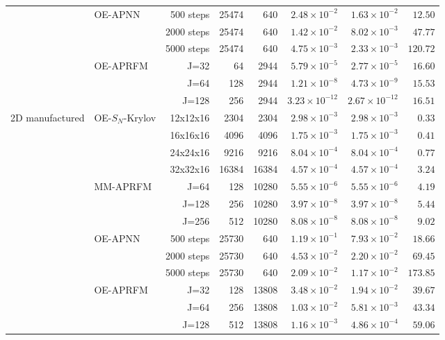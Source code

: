 \begin{table}[t]
\begin{tabular}{llrrrrrr}
 & OE-APNN & 500 steps & 25474 & 640 & $2.48\times10^{-2}$ & $1.63\times10^{-2}$ & $12.50$\\
 &  & 2000 steps & 25474 & 640 & $1.42\times10^{-2}$ & $8.02\times10^{-3}$ & $47.77$\\
 &  & 5000 steps & 25474 & 640 & $4.75\times10^{-3}$ & $2.33\times10^{-3}$ & $120.72$\\
 & OE-APRFM & J=32 & 64 & 2944 & $5.79\times10^{-5}$ & $2.77\times10^{-5}$ & $16.60$\\
 &  & J=64 & 128 & 2944 & $1.21\times10^{-8}$ & $4.73\times10^{-9}$ & $15.53$\\
 &  & J=128 & 256 & 2944 & $3.23\times10^{-12}$ & $2.67\times10^{-12}$ & $16.51$\\
\midrule
2D manufactured & OE-$S_N$-Krylov & 12x12x16 & 2304 & 2304 & $2.98\times10^{-3}$ & $2.98\times10^{-3}$ & $0.33$\\
 &  & 16x16x16 & 4096 & 4096 & $1.75\times10^{-3}$ & $1.75\times10^{-3}$ & $0.41$\\
 &  & 24x24x16 & 9216 & 9216 & $8.04\times10^{-4}$ & $8.04\times10^{-4}$ & $0.77$\\
 &  & 32x32x16 & 16384 & 16384 & $4.57\times10^{-4}$ & $4.57\times10^{-4}$ & $3.24$\\
 & MM-APRFM & J=64 & 128 & 10280 & $5.55\times10^{-6}$ & $5.55\times10^{-6}$ & $4.19$\\
 &  & J=128 & 256 & 10280 & $3.97\times10^{-8}$ & $3.97\times10^{-8}$ & $5.44$\\
 &  & J=256 & 512 & 10280 & $8.08\times10^{-8}$ & $8.08\times10^{-8}$ & $9.02$\\
 & OE-APNN & 500 steps & 25730 & 640 & $1.19\times10^{-1}$ & $7.93\times10^{-2}$ & $18.66$\\
 &  & 2000 steps & 25730 & 640 & $4.53\times10^{-2}$ & $2.20\times10^{-2}$ & $69.45$\\
 &  & 5000 steps & 25730 & 640 & $2.09\times10^{-2}$ & $1.17\times10^{-2}$ & $173.85$\\
 & OE-APRFM & J=32 & 128 & 13808 & $3.48\times10^{-2}$ & $1.94\times10^{-2}$ & $39.67$\\
 &  & J=64 & 256 & 13808 & $1.03\times10^{-2}$ & $5.81\times10^{-3}$ & $43.34$\\
 &  & J=128 & 512 & 13808 & $1.16\times10^{-3}$ & $4.86\times10^{-4}$ & $59.06$\\
\bottomrule
\end{tabular}
\end{table}


